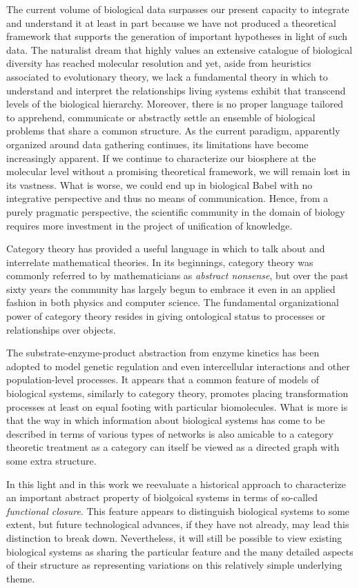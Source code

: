 \documentclass[aps,twocolumn]{revtex4-1}
\begin{document}
The current volume of biological data surpasses our present capacity to integrate and understand it at least in part because we have not produced a theoretical framework that supports the generation of important hypotheses in light of such data. The naturalist dream that highly values an extensive catalogue of biological diversity has reached molecular resolution and yet, aside from heuristics associated to evolutionary theory, we lack a fundamental theory in which to understand and interpret the relationships living systems exhibit that transcend levels of the biological hierarchy. Moreover, there is no proper language tailored to apprehend, communicate or abstractly settle an ensemble of biological problems that share a common structure. As the current paradigm, apparently organized around data gathering continues, its limitations have become increasingly apparent. If we continue to characterize our biosphere at the molecular level without a promising theoretical framework, we will remain lost in its vastness. What is worse, we could end up in biological Babel with no integrative perspective and thus no means of communication. Hence, from a purely pragmatic perspective, the scientific community in the domain of biology requires more investment in the project of unification of knowledge.

Category theory has provided a useful language in which to talk about and interrelate mathematical theories. In its beginnings, category theory was commonly referred to by mathematicians as {\it abstract nonsense}, but over the past sixty years the community has largely begun to embrace it even in an applied fashion in both physics and computer science. The fundamental organizational power of category theory resides in giving ontological status to processes or relationships over objects.

The substrate-enzyme-product abstraction from enzyme kinetics has been adopted to model genetic regulation and even intercellular interactions and other population-level processes. It appears that a common feature of models of biological systems, similarly to category theory, promotes placing transformation processes at least on equal footing with particular biomolecules. What is more is that the way in which information about biological systems has come to be described in terms of various types of networks is also amicable to a category theoretic treatment as a category can itself be viewed as a directed graph with some extra structure.

In this light and in this work we reevaluate a historical approach to characterize an important abstract property of biolgoical systems in terms of so-called {\it functional closure}. This feature appears to distinguish biological systems to some extent, but future technological advances, if they have not already, may lead this distinction to break down. Nevertheless, it will still be possible to view existing biological systems as sharing the particular feature and the many detailed aspects of their structure as representing variations on this relatively simple underlying theme.
\end{document}
